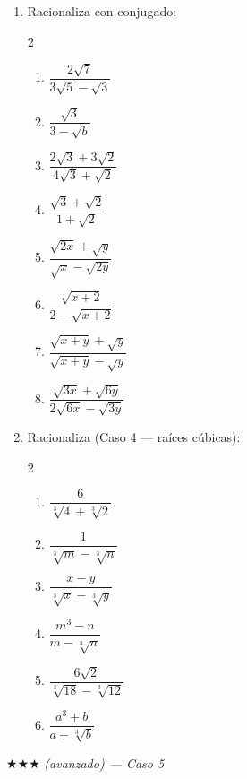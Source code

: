 \documentclass[11pt, letterpaper]{article}
\begin{document}
\begin{enumerate}[label=\textbf{\arabic*.}, leftmargin=*, resume]
  \item Racionaliza con conjugado:
  \begin{multicols}{2}
  \begin{enumerate}[label=\alph*)]
    \item $\dfrac{2\sqrt{7}}{3\sqrt{5}-\sqrt{3}}$
    \item $\dfrac{\sqrt{3}}{3-\sqrt{b}}$
    \item $\dfrac{2\sqrt{3}+3\sqrt{2}}{4\sqrt{3}+\sqrt{2}}$
    \item $\dfrac{\sqrt{3}+\sqrt{2}}{1+\sqrt{2}}$
    \item $\dfrac{\sqrt{2x}+\sqrt{y}}{\sqrt{x}-\sqrt{2y}}$
    \item $\dfrac{\sqrt{x+2}}{2-\sqrt{x+2}}$
    \item $\dfrac{\sqrt{x+y}+\sqrt{y}}{\sqrt{x+y}-\sqrt{y}}$
    \item $\dfrac{\sqrt{3x}+\sqrt{6y}}{2\sqrt{6x}-\sqrt{3y}}$
  \end{enumerate}
  \end{multicols}

  \item Racionaliza (Caso 4 — raíces cúbicas):
  \begin{multicols}{2}
  \begin{enumerate}[label=\alph*)]
    \item $\dfrac{6}{\sqrt[3]{4}+\sqrt[3]{2}}$
    \item $\dfrac{1}{\sqrt[3]{m}-\sqrt[3]{n}}$
    \item $\dfrac{x-y}{\sqrt[3]{x}-\sqrt[3]{y}}$
    \item $\dfrac{m^3-n}{m-\sqrt[3]{n}}$
    \item $\dfrac{6\sqrt{2}}{\sqrt[3]{18}-\sqrt[3]{12}}$
    \item $\dfrac{a^3+b}{a+\sqrt[3]{b}}$
  \end{enumerate}
  \end{multicols}
\end{enumerate}

$\bigstar\bigstar\bigstar$ \textit{(avanzado) — Caso 5}
\end{document}
